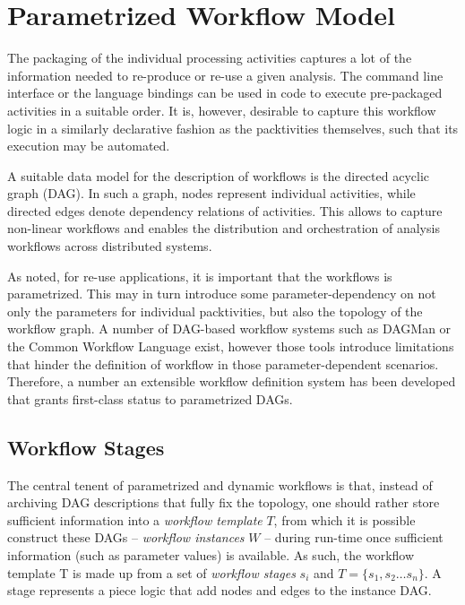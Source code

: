\documentclass[a4paper]{jpconf}
\begin{document}
\section{Parametrized Workflow Model}

The packaging of the individual processing activities captures a lot of the information needed to re-produce or re-use a given analysis. The command line interface or the language bindings can be used in code to execute pre-packaged activities in a suitable order. It is, however, desirable to capture this workflow logic in a similarly declarative fashion as the packtivities themselves, such that its execution may be automated.

A suitable data model for the description of workflows is the directed acyclic graph (DAG). In such a graph, nodes represent individual activities, while directed edges denote dependency relations of activities. This allows to capture non-linear workflows and enables the distribution and orchestration of analysis workflows across distributed systems.

As noted, for re-use applications, it is important that the workflows is parametrized. This may in turn introduce some parameter-dependency on not only the parameters for individual packtivities, but also the topology of the workflow graph. A number of DAG-based workflow systems such as DAGMan or the Common Workflow Language \cite{HTCondorDAGMan,Amstutz2016} exist, however those tools introduce limitations that hinder the definition of workflow in those parameter-dependent scenarios. Therefore, a number an extensible workflow definition system has been developed that grants first-class status to parametrized DAGs.

\subsection{Workflow Stages}

The central tenent of parametrized and dynamic workflows is that, instead of archiving DAG descriptions that fully fix the topology, one should rather store sufficient information into a \emph{workflow template} $T$, from which it is possible construct these DAGs -- \emph{workflow instances} $W$ -- during run-time once sufficient information (such as parameter values) is available. As such, the workflow template T is made up from a set of \emph{workflow stages} $s_i$ and $T = \{s_1,s_2\dots s_n\}$. A stage represents a piece logic that add nodes and edges to the instance DAG.
\end{document}
